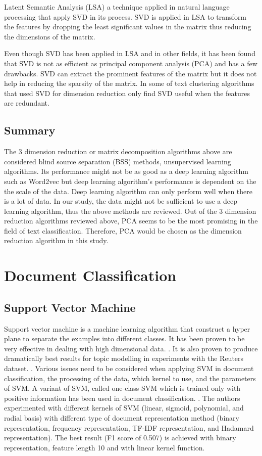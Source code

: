 Latent Semantic Analysis (LSA) a technique applied in natural language processing that apply SVD in its process. SVD is applied in LSA to transform the features by dropping the least significant values in the matrix thus reducing the dimensions of the matrix. \cite{fuzzyLash}
	
Even though SVD has been applied in LSA and in other fields, it has been found that SVD is not as efficient as principal component analysis (PCA) and has a few drawbacks. SVD can extract the prominent features of the matrix but it does not help in reducing the sparsity of the matrix. 	In some of text clustering algorithms that used SVD for dimension reduction only find SVD useful when the features are redundant. \cite{lingo}

	
\subsection{Summary}
The 3 dimension reduction or matrix decomposition algorithms above are considered blind source separation (BSS) methods, unsupervised learning algorithms. Its performance might not be as good as a deep learning algorithm such as Word2vec but deep learning algorithm's performance is dependent on the the scale of the data. Deep learning algorithm can only perform well when there is a lot of data. In our study, the data might not be sufficient to use a deep learning algorithm, thus the above methods are reviewed. Out of the 3 dimension reduction algorithms reviewed above, PCA seems to be the most promising in the field of text classification. Therefore, PCA would be chosen as the dimension reduction algorithm in this study.
	
\section{Document Classification}
\subsection{Support Vector Machine}
Support vector machine is a machine learning algorithm that construct a hyper plane to separate the examples into different classes. It has been proven to be very effective in dealing with high dimensional data. \cite{webSvm}. It is also proven to produce dramatically best results for topic modelling in experiments with the Reuters dataset. \cite{inductiveText}. Various issues need to be considered when applying SVM in document classification, the processing of the data, which kernel to use, and the parameters of SVM. A variant of SVM, called one-class SVM which is trained only with positive information has been used in document classification. \cite{oneSvm}.  The authors experimented with different kernels of SVM (linear, sigmoid, polynomial, and radial basis) with different type of document representation method (binary representation, frequency representation, TF-IDF representation, and Hadamard representation). The best result (F1 score of 0.507) is achieved with binary representation, feature length 10 and with linear kernel function.  
	
